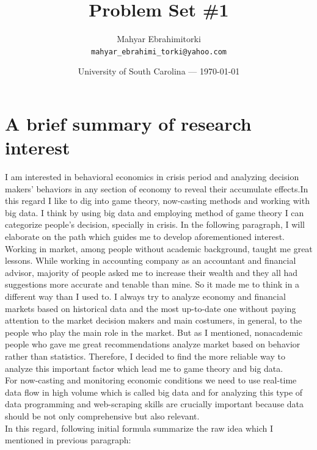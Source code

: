 \documentclass{article}
\title{Problem Set \#1 } %
\author{Mahyar Ebrahimitorki\\ \texttt{mahyar\_ebrahimi\_torki@yahoo.com}} %
\date{University of South Carolina --- \today} %
\begin{document}
\maketitle %


\section*{ A brief summary of research interest } %

I am interested in behavioral economics in crisis period and analyzing decision makers' behaviors in any section of economy to reveal their accumulate effects.In this regard I like to dig into game theory, now-casting methods and working with big data. I think by using big data and employing method of game theory I can categorize people's decision, specially in crisis. In the following paragraph, I will elaborate on the path which guides me to develop aforementioned interest.\\
Working in market, among people without academic background, taught me great lessons. While working in accounting company as an accountant and financial advisor, majority of people asked me to increase their wealth and they all had suggestions more accurate and tenable than mine. So it made me to think in a different way than I used to. I always try to analyze economy and financial markets based on historical data and the most up-to-date one without paying attention to the market decision makers and main costumers, in general, to the people who play the main role in the market. But as I mentioned, nonacademic people who gave me great recommendations analyze market based on behavior rather than statistics. Therefore, I decided to find the more reliable way to analyze this important factor which lead me to game theory and big data.\\
For now-casting and monitoring economic conditions we need to use real-time data flow  in high volume \cite{bok2018macroeconomic} which is called big data and for analyzing this type of data programming and web-scraping skills are crucially important because data should be not only comprehensive  but also relevant. \\
In this regard, following initial formula summarize the raw idea which I mentioned in previous paragraph:
\end{document}
